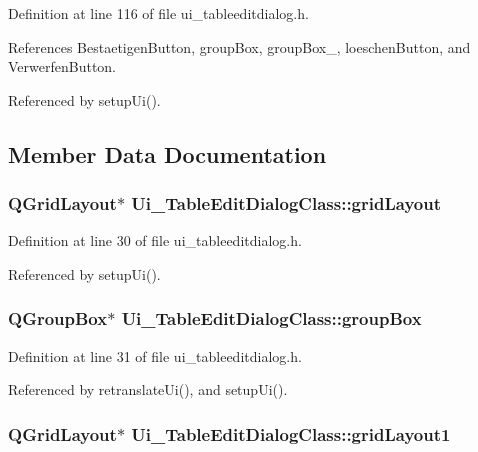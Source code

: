 Definition at line 116 of file ui\_\-tableeditdialog.h.

References BestaetigenButton, groupBox, groupBox\_, loeschenButton, and VerwerfenButton.

Referenced by setupUi().

\subsection{Member Data Documentation}
\hypertarget{class_ui___table_edit_dialog_class_c2430c3aa774dccb4871d830b15253ca}{
\subsubsection[gridLayout]{\setlength{\rightskip}{0pt plus 5cm}QGridLayout$\ast$ {\bf Ui\_\-TableEditDialogClass::gridLayout}}}
\label{class_ui___table_edit_dialog_class_c2430c3aa774dccb4871d830b15253ca}




Definition at line 30 of file ui\_\-tableeditdialog.h.

Referenced by setupUi().\hypertarget{class_ui___table_edit_dialog_class_28b300c690a4f3ca0a883522d313523e}{
\subsubsection[groupBox]{\setlength{\rightskip}{0pt plus 5cm}QGroupBox$\ast$ {\bf Ui\_\-TableEditDialogClass::groupBox}}}
\label{class_ui___table_edit_dialog_class_28b300c690a4f3ca0a883522d313523e}




Definition at line 31 of file ui\_\-tableeditdialog.h.

Referenced by retranslateUi(), and setupUi().\hypertarget{class_ui___table_edit_dialog_class_0b5da6fae78eda462f424a3883109de5}{
\subsubsection[gridLayout1]{\setlength{\rightskip}{0pt plus 5cm}QGridLayout$\ast$ {\bf Ui\_\-TableEditDialogClass::gridLayout1}}}
\label{class_ui___table_edit_dialog_class_0b5da6fae78eda462f424a3883109de5}




